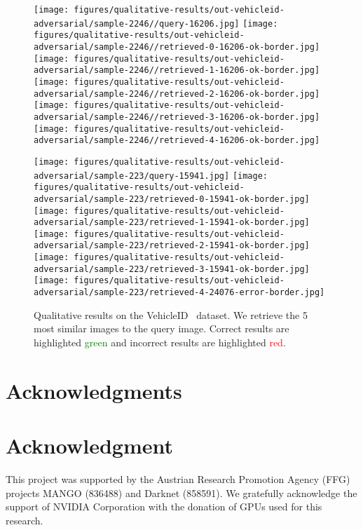 \documentclass[10pt,journal,compsoc]{IEEEtran}
\begin{document}
\begin{figure*}[htbp]
\begin{center}
    \vspace{0.2cm}
    \texttt{[image: figures/qualitative-results/out-vehicleid-adversarial/sample-2246//query-16206.jpg]}
    \texttt{[image: figures/qualitative-results/out-vehicleid-adversarial/sample-2246//retrieved-0-16206-ok-border.jpg]}
    \texttt{[image: figures/qualitative-results/out-vehicleid-adversarial/sample-2246//retrieved-1-16206-ok-border.jpg]}
    \texttt{[image: figures/qualitative-results/out-vehicleid-adversarial/sample-2246//retrieved-2-16206-ok-border.jpg]}
    \texttt{[image: figures/qualitative-results/out-vehicleid-adversarial/sample-2246//retrieved-3-16206-ok-border.jpg]}
    \texttt{[image: figures/qualitative-results/out-vehicleid-adversarial/sample-2246//retrieved-4-16206-ok-border.jpg]}

    \vspace{0.2cm}
    \texttt{[image: figures/qualitative-results/out-vehicleid-adversarial/sample-223/query-15941.jpg]}
    \texttt{[image: figures/qualitative-results/out-vehicleid-adversarial/sample-223/retrieved-0-15941-ok-border.jpg]}
    \texttt{[image: figures/qualitative-results/out-vehicleid-adversarial/sample-223/retrieved-1-15941-ok-border.jpg]}
    \texttt{[image: figures/qualitative-results/out-vehicleid-adversarial/sample-223/retrieved-2-15941-ok-border.jpg]}
    \texttt{[image: figures/qualitative-results/out-vehicleid-adversarial/sample-223/retrieved-3-15941-ok-border.jpg]}
    \texttt{[image: figures/qualitative-results/out-vehicleid-adversarial/sample-223/retrieved-4-24076-error-border.jpg]}

    \end{center}
    \caption{Qualitative results on the VehicleID~\cite{liu2016deep} dataset. 
             We retrieve the 5 most similar images to the query image.
             Correct results are highlighted \textcolor{green}{green} and incorrect results are highlighted \textcolor{red}{red}.}
    \label{fig:qualitative-vehicleid}
\end{figure*}\ifCLASSOPTIONcompsoc\section*{Acknowledgments}\else\section*{Acknowledgment}\fi

This project was supported by the Austrian Research Promotion Agency (FFG) projects MANGO (836488) and Darknet (858591). We gratefully acknowledge the support of NVIDIA Corporation with the donation of GPUs used for this research.

\ifCLASSOPTIONcaptionsoff\newpage\fi
\end{document}
